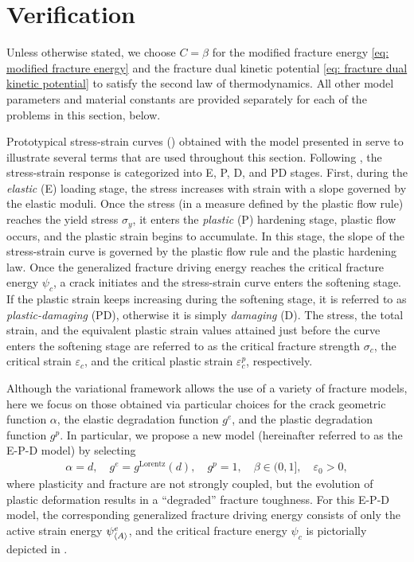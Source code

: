 \section{Verification}
\label{section: Chapter5/verification}

Unless otherwise stated, we choose $C = \beta$ for the modified fracture energy \eqref{eq: modified fracture energy} and the fracture dual kinetic potential \eqref{eq: fracture dual kinetic potential} to satisfy the second law of thermodynamics. All other model parameters and material constants are provided separately for each of the problems in this section, below.



Prototypical stress-strain curves () obtained with the model presented in  serve to illustrate several terms that are used throughout this section. Following \cite{alessi_coupling_2018}, the stress-strain response is categorized into \textrm{E}, \textrm{P}, \textrm{D}, and \textrm{PD} stages. First, during the \emph{elastic} (\textrm{E}) loading stage, the stress increases with strain with a slope governed by the elastic moduli. Once the stress (in a measure defined by the plastic flow rule) reaches the yield stress $\sigma_y$, it enters the \emph{plastic} (\textrm{P}) hardening stage, plastic flow occurs, and the plastic strain begins to accumulate. In this stage, the slope of the stress-strain curve is governed by the plastic flow rule and the plastic hardening law.
Once the generalized fracture driving energy reaches the critical fracture energy $\psi_c$, a crack initiates and the stress-strain curve enters the softening stage. If the plastic strain keeps increasing during the softening stage, it is referred to as \emph{plastic-damaging} (\textrm{PD}), otherwise it is simply \emph{damaging} (\textrm{D}). The stress, the total strain, and the equivalent plastic strain values attained just before the curve enters the softening stage are referred to as the critical fracture strength $\sigma_c$, the critical strain $\varepsilon_c$, and the critical plastic strain $\varepsilon^p_c$, respectively.

Although the variational framework allows the use of a variety of fracture models, here we focus on those obtained via particular choices for the crack geometric function $\alpha$, the elastic degradation function $g^e$, and the plastic degradation function $g^p$. In particular, we propose a new model (hereinafter referred to as the E-P-D model) by selecting
\begin{align*}
  \alpha = d, \quad g^e = g^\text{Lorentz}(d), \quad g^p = 1, \quad \beta \in (0,1], \quad \varepsilon_0 > 0,
\end{align*}
where plasticity and fracture are not strongly coupled, but the evolution of plastic deformation results in a ``degraded'' fracture toughness. For this E-P-D model, the corresponding generalized fracture driving energy consists of only the active strain energy $\psi^e_{\left< A \right>}$, and the critical fracture energy $\psi_c$ is pictorially depicted in .

